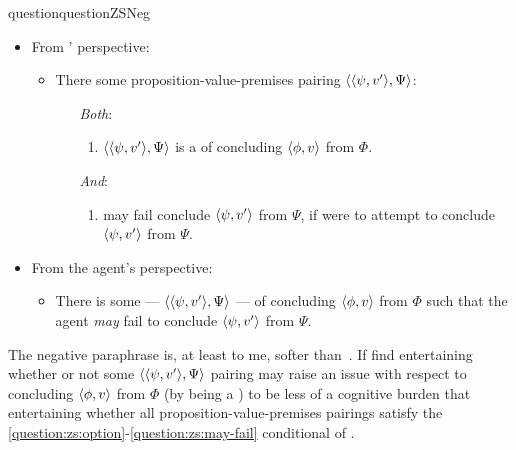 \begin{note}[\qzS{} \(\forall\)]
{\begin{restatable}[\nqzS{}]{question}{questionZSNeg}
      \begin{itemize}
      \item
        From \vAgent{}' perspective:
        \begin{itemize}
        \item
          There some proposition-value-premises pairing \(\langle \langle \psi, v' \rangle, \Psi \rangle\):
          \begin{itemize}
          \item[\emph{Both}:]
            \begin{enumerate}[label=\alph*., ref=(\alph*)]
            \item
              \(\langle \langle \psi, v' \rangle, \Psi \rangle\) is a \requ{} of concluding \(\langle \phi, v \rangle\) from \(\Phi\).
            \end{enumerate}
          \item[\emph{And}:]
            \begin{enumerate}[label=\alph*., ref=(\alph*), resume]
            \item
              \vAgent{} may fail conclude \(\langle \psi, v' \rangle\) from \(\Psi\), if \vAgent{} were to attempt to conclude \(\langle \psi, v' \rangle\) from \(\Psi\).
            \end{enumerate}
          \end{itemize}
        \end{itemize}
      \end{itemize}
      \vspace{-\baselineskip}
    \end{restatable}
  }
  \begin{itemize}
  \item
    From the agent's perspective:
    \begin{itemize}
    \item
      There is some \requ{} --- \(\langle \langle \psi, v' \rangle, \Psi \rangle\) --- of concluding \(\langle \phi, v \rangle\) from \(\Phi\) such that the agent \emph{may} fail to conclude \(\langle \psi, v' \rangle\) from \(\Psi\).
    \end{itemize}
  \end{itemize}

  The negative paraphrase is, at least to me, softer than~\qzS{}.
  If find entertaining whether or not some \(\langle \langle \psi, v' \rangle, \Psi \rangle\) pairing may raise an issue with respect to concluding \(\langle \phi, v \rangle\) from \(\Phi\) (by being a \requ{}) to be less of a cognitive burden that entertaining whether all proposition-value-premises pairings satisfy the \ref{question:zs:option}-\ref{question:zs:may-fail} conditional of \qzS{}.


\end{note}

